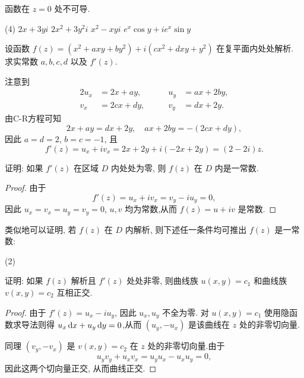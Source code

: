 \begin{exercise}
  函数\fillbrace{}在 $z=0$ 处不可导.
  \begin{taskschoice}(4)
    \task $2x+3yi$
    \task $2x^2+3y^2i$
    \task $x^2-xyi$
    \task $e^x\cos y+i e^x\sin y$
  \end{taskschoice}
\end{exercise}

\begin{example}
  设函数 $f(z)=(x^2+axy+by^2)+i(cx^2+dxy+y^2)$ 在复平面内处处解析. 求实常数 $a,b,c,d$ 以及 $f'(z)$.
\end{example}
\begin{solution}
  注意到
  \begin{alignat*}{2}
    u_x&=2x+ay,\qquad&u_y&=ax+2by,\\
    v_x&=2cx+dy,\qquad&v_y&=dx+2y.
  \end{alignat*}
  由C-R方程可知
    \[2x+ay=dx+2y,\quad ax+2by=-(2cx+dy),\]
  因此 $a=d=2$, $b=c=-1$, 且
    \[f'(z)=u_x+iv_x=2x+2y+i(-2x+2y)=(2-2i)z.\]
\end{solution}

\begin{example}\label{exam:zero-deriv-constant}
  证明: 如果 $f'(z)$ 在区域 $D$ 内处处为零, 则 $f(z)$ 在 $D$ 内是一常数.
\end{example}

\begin{proof}
  由于
    \[f'(z)=u_x+iv_x=v_y-iu_y=0,\]
  因此 $u_x=v_x=u_y=v_y=0$, $u,v$ 均为常数,从而  $f(z)=u+iv$ 是常数.
\end{proof}
类似地可以证明, 若 $f(z)$ 在 $D$ 内解析, 则下述任一条件均可推出 $f(z)$ 是一常数:
\begin{tasksexam}(2)
\end{tasksexam}

\begin{example}
  证明: 如果 $f(z)$ 解析且 $f'(z)$ 处处非零, 则曲线族 $u(x,y)=c_1$ 和曲线族 $v(x,y)=c_2$ 互相正交.
\end{example}

\begin{proof}
  由于 $f'(z)=u_x-iu_y$, 因此 $u_x,u_y$ 不全为零.
  对 $u(x,y)=c_1$ 使用隐函数求导法则得 $u_x\,\mathrm{d} x+u_y\,\mathrm{d} y=0$,从而 $(u_y,-u_x)$ 是该曲线在 $z$ 处的非零切向量.

  同理 $(v_y,-v_x)$ 是 $v(x,y)=c_2$ 在 $z$ 处的非零切向量.由于
    \[u_yv_y+u_xv_x=u_yu_x-u_xu_y=0,\]
  因此这两个切向量正交, 从而曲线正交.
\end{proof}

